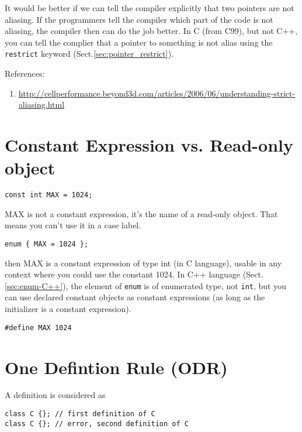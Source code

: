 It would be better if we can tell the compiler explicitly that two pointers are
not aliasing. If the programmers tell the compiler which part of the code is not
aliasing, the compiler then can do the job better.
In C (from C99), but not C++, you can tell the complier that a pointer to
something is not alias using the \verb!restrict! keyword
(Sect.\ref{sec:pointer_restrict}).

References:
\begin{enumerate}
  \item
  \url{http://cellperformance.beyond3d.com/articles/2006/06/understanding-strict-aliasing.html}
\end{enumerate}


\section{Constant Expression vs. Read-only object}
\label{sec:constant-expression}
\label{sec:read-only-object}

\begin{verbatim}
const int MAX = 1024;
\end{verbatim}
MAX is not a constant expression, it's the name of a read-only object.
That means you can't use it in a case label.

\begin{verbatim}
enum { MAX = 1024 };
\end{verbatim}
then MAX is a constant expression of type int (in C language), usable in any
context where you could use the constant 1024. In C++ language (Sect.\ref{sec:enum-C++}), the element of \verb!enum! is of enumerated type,
not \verb!int!, but you can use declared constant objects as constant expressions (as long as the initializer is a constant expression).


\begin{verbatim}
#define MAX 1024
\end{verbatim}



\section{One Defintion Rule (ODR)}
\label{sec:one-definition-rule}

A definition is considered as 
\begin{verbatim}
class C {}; // first definition of C
class C {}; // error, second definition of C
\end{verbatim}

